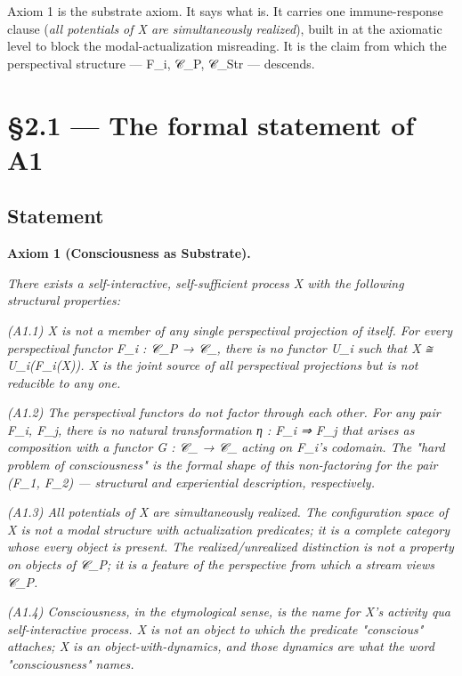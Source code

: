 \documentclass[11pt, openany]{book}
\newcommand{\sectionbreak}{\clearpage}
\begin{document}
Axiom 1 is the substrate axiom. It says what is. It carries one immune-response clause (\textit{all potentials of X are simultaneously realized}), built in at the axiomatic level to block the modal-actualization misreading. It is the claim from which the perspectival structure --- F\_\allowbreak{}i, 𝒞\_\allowbreak{}P, 𝒞\_\allowbreak{}Str --- descends.

\sectionbreak

\section{§2.1 --- The formal statement of A1}

\subsection{Statement}

\textbf{Axiom 1 (Consciousness as Substrate).}

\textit{There exists a self-interactive, self-sufficient process X with the following structural properties:}

\textit{(A1.1) X is not a member of any single perspectival projection of itself. For every perspectival functor F\_\allowbreak{}i : 𝒞\_\allowbreak{}P → 𝒞\_, there is no functor U\_\allowbreak{}i such that X ≅ U\_\allowbreak{}i(F\_\allowbreak{}i(X)). X is the joint source of all perspectival projections but is not reducible to any one.}

\textit{(A1.2) The perspectival functors do not factor through each other. For any pair F\_\allowbreak{}i, F\_\allowbreak{}j, there is no natural transformation η : F\_\allowbreak{}i ⇒ F\_\allowbreak{}j that arises as composition with a functor G : 𝒞\_ → 𝒞\_ acting on F\_\allowbreak{}i's codomain. The "hard problem of consciousness" is the formal shape of this non-factoring for the pair (F\_\allowbreak{}1, F\_\allowbreak{}2) --- structural and experiential description, respectively.}

\textit{(A1.3) All potentials of X are simultaneously realized. The configuration space of X is not a modal structure with actualization predicates; it is a complete category whose every object is present. The realized/unrealized distinction is not a property on objects of 𝒞\_\allowbreak{}P; it is a feature of the perspective from which a stream views 𝒞\_\allowbreak{}P.}

\textit{(A1.4) Consciousness, in the etymological sense, is the name for X's activity qua self-interactive process. X is not an object to which the predicate "conscious" attaches; X is an object-with-dynamics, and those dynamics are what the word "consciousness" names.}
\end{document}
